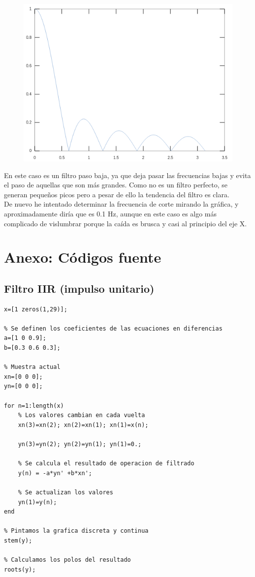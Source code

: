 \documentclass[11pt,a4paper]{article}
\begin{document}
\begin{figure}[H]
	\centering
	\includegraphics[scale=0.4]{img/freqz-fir.png}
\end{figure}

En este caso es un filtro paso baja, ya que deja pasar las frecuencias bajas y evita el paso de aquellas que son más grandes. Como no es un filtro perfecto, se generan pequeños picos pero a pesar de ello la tendencia del filtro es clara.\\

De nuevo he intentado determinar la frecuencia de corte mirando la gráfica, y aproximadamente diría que es 0.1 Hz, aunque en este caso es algo más complicado de vislumbrar porque la caída es brusca y casi al principio del eje X.

\newpage

\section{Anexo: Códigos fuente}

\subsection{Filtro IIR (impulso unitario)}
\label{code1}

\begin{lstlisting}[frame=single]
% Se define el array con los pulsos
x=[1 zeros(1,29)];

% Se definen los coeficientes de las ecuaciones en diferencias
a=[1 0 0.9];
b=[0.3 0.6 0.3];

% Muestra actual
xn=[0 0 0];
yn=[0 0 0];

for n=1:length(x)
	% Los valores cambian en cada vuelta
	xn(3)=xn(2); xn(2)=xn(1); xn(1)=x(n);

	yn(3)=yn(2); yn(2)=yn(1); yn(1)=0.;

	% Se calcula el resultado de operacion de filtrado
	y(n) = -a*yn' +b*xn';

	% Se actualizan los valores
	yn(1)=y(n);
end

% Pintamos la grafica discreta y continua
stem(y);

% Calculamos los polos del resultado
roots(y);
\end{lstlisting}
\end{document}
